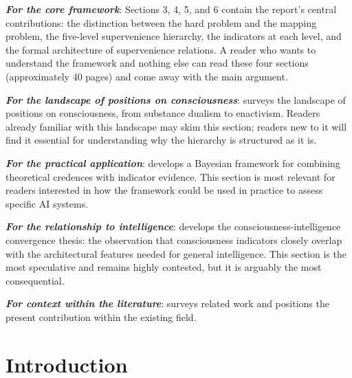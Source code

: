 \documentclass[11pt, a4paper, onecolumn, gdm]{google}
\begin{document}
\emph{\textbf{For the core framework}}: Sections 3, 4, 5, and 6 contain the report's central contributions: the distinction between the hard problem and the mapping problem, the five-level supervenience hierarchy, the indicators at each level, and the formal architecture of supervenience relations.
A reader who wants to understand the framework and nothing else can read these four sections (approximately 40 pages) and come away with the main argument.

\emph{\textbf{For the landscape of positions on consciousness}}:  surveys the landscape of positions on consciousness, from substance dualism to enactivism.
Readers already familiar with this landscape may skim this section; readers new to it will find it essential for understanding why the hierarchy is structured as it is.

\emph{\textbf{For the practical application}}:  develops a Bayesian framework for combining theoretical credences with indicator evidence.
This section is most relevant for readers interested in how the framework could be used in practice to assess specific AI systems.

\emph{\textbf{For the relationship to intelligence}}:  develops the consciousness-intelligence convergence thesis: the observation that consciousness indicators closely overlap with the architectural features needed for general intelligence.
This section is the most speculative and remains highly contested, but it is arguably the most consequential.

\emph{\textbf{For context within the literature}}:  surveys related work and positions the present contribution within the existing field.

\clearpage
\tableofcontents
\clearpage

\section{Introduction}\label{introduction}
\end{document}
